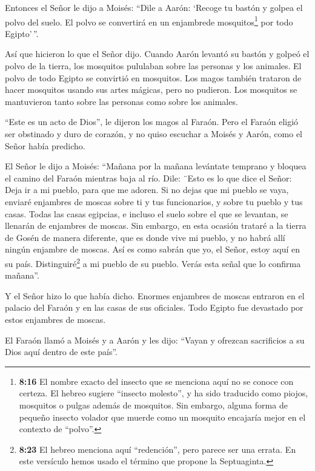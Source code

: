  Entonces el Señor le dijo a Moisés: ``Dile a Aarón:
`Recoge tu bastón y golpea el polvo del suelo. El polvo se convertirá en
un enjambrede mosquitos\footnote{\textbf{8:16} El nombre exacto del
  insecto que se menciona aquí no se conoce con certeza. El hebreo
  sugiere ``insecto molesto'', y ha sido traducido como piojos,
  mosquitos o pulgas además de mosquitos. Sin embargo, alguna forma de
  pequeño insecto volador que muerde como un mosquito encajaría mejor en
  el contexto de ``polvo''.} por todo Egipto'\,''.

 Así que hicieron lo que el Señor dijo. Cuando Aarón
levantó su bastón y golpeó el polvo de la tierra, los mosquitos
pululaban sobre las personas y los animales. El polvo de todo Egipto se
convirtió en mosquitos.  Los magos también trataron de
hacer mosquitos usando sus artes mágicas, pero no pudieron. Los
mosquitos se mantuvieron tanto sobre las personas como sobre los
animales.

 ``Este es un acto de Dios'', le dijeron los magos al
Faraón. Pero el Faraón eligió ser obstinado y duro de corazón, y no
quiso escuchar a Moisés y Aarón, como el Señor había predicho.

 El Señor le dijo a Moisés: ``Mañana por la mañana
levántate temprano y bloquea el camino del Faraón mientras baja al río.
Dile: ¨Esto es lo que dice el Señor: Deja ir a mi pueblo, para que me
adoren.  Si no dejas que mi pueblo se vaya, enviaré
enjambres de moscas sobre ti y tus funcionarios, y sobre tu pueblo y tus
casas. Todas las casas egipcias, e incluso el suelo sobre el que se
levantan, se llenarán de enjambres de moscas.  Sin embargo,
en esta ocasión trataré a la tierra de Gosén de manera diferente, que es
donde vive mi pueblo, y no habrá allí ningún enjambre de moscas. Así es
como sabrán que yo, el Señor, estoy aquí en su país. 
Distinguiré\footnote{\textbf{8:23} El hebreo menciona aquí
  ``redención'', pero parece ser una errata. En este versículo hemos
  usado el término que propone la Septuaginta.} a mi pueblo de su
pueblo. Verás esta señal que lo confirma mañana''.

 Y el Señor hizo lo que había dicho. Enormes enjambres de
moscas entraron en el palacio del Faraón y en las casas de sus
oficiales. Todo Egipto fue devastado por estos enjambres de moscas.

 El Faraón llamó a Moisés y a Aarón y les dijo: ``Vayan y
ofrezcan sacrificios a su Dios aquí dentro de este país''.

